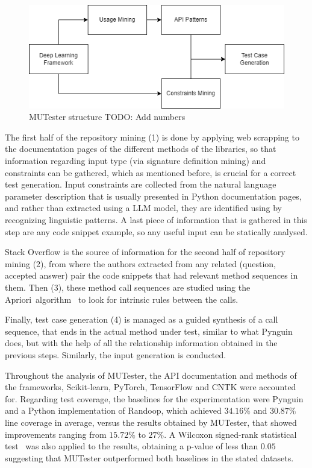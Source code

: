 \documentclass[%
  chapterprefix=false,%
  open=right,%
  twoside=true,%
  paper=a4,%
  logofile={Figures/logo.png},%
  thesistype=master,%
  UKenglish,%
]{se2thesis}
\begin{document}
\begin{figure}[tb]
  \centering 
  \includegraphics[width=.99\textwidth]{Figures/mutester.png}
  \caption{MUTester structure TODO: Add numbers}\label{fig:mutester}
\end{figure}

The first half of the repository mining (1) is done by applying web scrapping to the documentation pages of the different methods of the libraries, so that information regarding input type (via signature definition mining) and constraints can be gathered, which as mentioned before, is crucial for a correct test generation.
Input constraints are collected from the natural language parameter description that is usually presented in Python documentation pages, and rather than extracted using a LLM model, they are identified using by recognizing linguistic patterns.
A last piece of information that is gathered in this step are any code snippet example, so any useful input can be statically analysed.

Stack Overflow is the source of information for the second half of repository mining (2), from where the authors extracted from any related (question, accepted answer) pair the code snippets that had relevant method sequences in them.
Then (3), these method call sequences are studied using the Apriori~algorithm~\cite{agrawal1994fast} to look for intrinsic rules between the calls.

Finally, test case generation (4) is managed as a guided synthesis of a call sequence, that ends in the actual method under test, similar to what Pynguin does, but with the help of all the relationship information obtained in the previous steps.
Similarly, the input generation is conducted.

Throughout the analysis of MUTester, the API documentation and methods of the frameworks,  Scikit-learn, PyTorch, TensorFlow and CNTK were accounted for.
Regarding test coverage, the baselines for the experimentation were Pynguin and a Python implementation of Randoop, which achieved \(34.16\%\) and \(30.87\%\) line coverage in average, versus the results obtained by MUTester, that showed improvements ranging from \(15.72\%\) to \(27\%\).
A Wilcoxon signed-rank
statistical test~\cite{Rey2011} was also applied to the results, obtaining a p-value of less than \(0.05\) suggesting that MUTester outperformed both baselines in the stated datasets.
\end{document}
